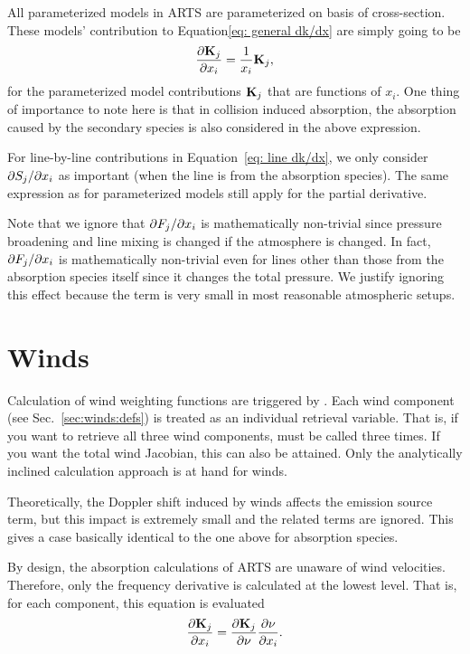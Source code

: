 All parameterized models in ARTS are parameterized on basis of cross-section.
These models' contribution to Equation\ref{eq: general dk/dx} are simply going to be
\begin{equation}
 \frac{\partial \mathbf{K}_j}{\partial x_i}=\frac{1}{x_i} \mathbf{K}_j,
\end{equation}
for the parameterized model contributions $\mathbf{K}_j$ that are functions of $x_i$.
One thing of importance to note here is that in collision induced absorption, the 
absorption caused by the secondary species is also considered in the above expression.
 
For line-by-line contributions in Equation~\ref{eq: line dk/dx},
we only consider $\partial S_j/\partial x_i$ as important (when the line is from the absorption species).
The same expression as for parameterized models still apply for the partial derivative.

Note that we ignore that $\partial F_j/\partial x_i$ is mathematically non-trivial since pressure broadening 
and line mixing is changed if the atmosphere is changed.  In fact, $\partial F_j/\partial x_i$ is 
mathematically non-trivial even for lines other than those from the absorption species itself
since it changes the total pressure.  We justify ignoring this effect because the term is very 
small in most reasonable atmospheric setups.

\section{Winds}
\label{sec:wfuns:winds}
%
Calculation of wind weighting functions are triggered by
. Each wind component (see Sec.~\ref{sec:winds:defs})
is treated as an individual retrieval variable. That is, if you want to
retrieve all three wind components,  must be called
three times. If you want the total wind Jacobian, this can also be attained.
Only the analytically inclined calculation approach is at hand for winds.

Theoretically, the Doppler shift induced by winds affects the emission source
term, but this impact is extremely small
and the related terms are ignored. This gives a case basically identical to the
one above for absorption species.

By design, the absorption calculations of ARTS are unaware of wind velocities.  
Therefore, only the frequency derivative is calculated at the lowest level.  That is,
for each component, this equation is evaluated
\begin{equation}
   \frac{\partial \mathbf{K}_j}{\partial x_i}=\frac{\partial \mathbf{K}_j}{\partial \nu} \frac{\partial \nu}{\partial x_i}.
\end{equation}

